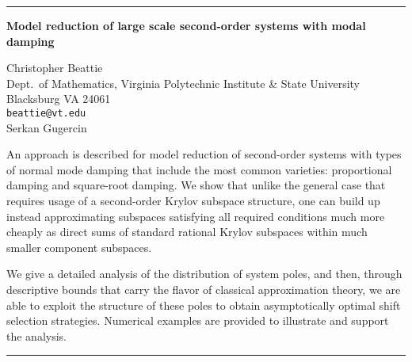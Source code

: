 \documentclass[twosided]{report}
\begin{document}
	\begin{center} \rule{6in}{1pt} \end{center}

\newpage

\begin{center}
{\large			%
{\bf Model reduction of large scale second-order systems with modal damping}}

	Christopher Beattie \\
	Dept.~of Mathematics,
	Virginia Polytechnic Institute \& State University \\
	Blacksburg VA 24061 \\
	{\tt beattie@vt.edu} \\
	Serkan Gugercin
\end{center}
An approach is described for model reduction of second-order
systems with types of normal mode damping that include the
most common varieties: proportional damping and square-root
damping. We show that unlike the general case that requires
usage of a second-order Krylov subspace structure, one can
build up instead approximating subspaces satisfying all
required conditions much more cheaply as direct sums of
standard rational Krylov subspaces within much smaller
component subspaces.

We give a detailed analysis of the
distribution of system poles, and then, through descriptive
bounds that carry the flavor of classical approximation
theory, we are able to exploit the structure of these poles
to obtain asymptotically optimal shift selection strategies.
Numerical examples are provided to illustrate and support
the analysis.


	\begin{center} \rule{6in}{1pt} \end{center}
\end{document}

